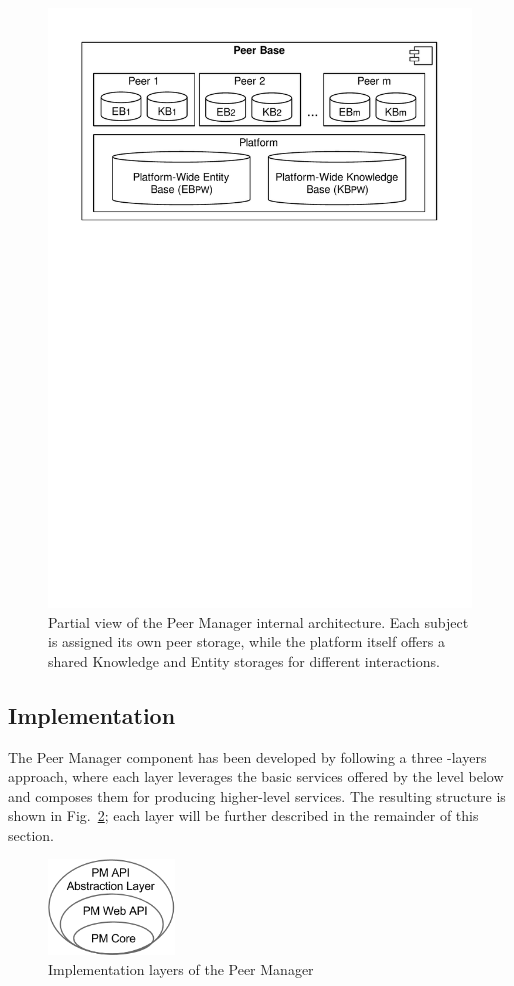 \begin{figure}[t]
	\centering
	\includegraphics[width=0.65\linewidth]{figures/peerBase-diagram.pdf}
	\caption{Partial view of the Peer Manager internal architecture. Each subject is assigned its own peer storage, while the platform itself offers a shared Knowledge and Entity storages for different interactions.}
	\label{fig:peerManagerPlatform}
\end{figure}

\subsection{Implementation}

The Peer Manager component has been developed by following a three -layers approach, where each layer leverages the basic services offered by the level below and composes them for producing higher-level services. The resulting structure is shown in Fig.~\ref{fig:pm-component-layers}; each layer will be further described in the remainder of this section. 

\begin{figure}[htbp]
\centering
\includegraphics[width=0.3\textwidth]{figures/pm-component-layers.png}
\caption{Implementation layers of the Peer Manager}
\label{fig:pm-component-layers}
\end{figure}

